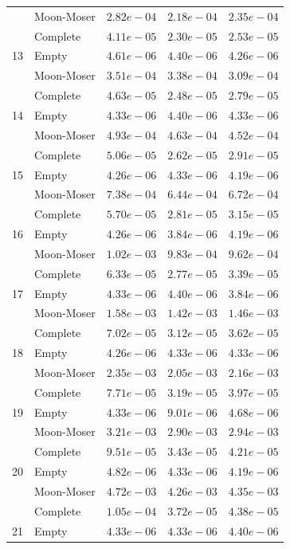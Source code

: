 \documentclass[12pt,a4paper]{article}
\begin{document}
\begin{longtable}{|l||l|l|l|l|}
  & Moon-Moser & $2.82e-04$ & $2.18e-04$ & $2.35e-04$ \\
  & Complete & $4.11e-05$ & $2.30e-05$ & $2.53e-05$ \\
  \hline
  13 & Empty & $4.61e-06$ & $4.40e-06$ & $4.26e-06$ \\
  & Moon-Moser & $3.51e-04$ & $3.38e-04$ & $3.09e-04$ \\
  & Complete & $4.63e-05$ & $2.48e-05$ & $2.79e-05$ \\
  \hline
  14 & Empty & $4.33e-06$ & $4.40e-06$ & $4.33e-06$ \\
  & Moon-Moser & $4.93e-04$ & $4.63e-04$ & $4.52e-04$ \\
  & Complete & $5.06e-05$ & $2.62e-05$ & $2.91e-05$ \\
  \hline
  15 & Empty & $4.26e-06$ & $4.33e-06$ & $4.19e-06$ \\
  & Moon-Moser & $7.38e-04$ & $6.44e-04$ & $6.72e-04$ \\
  & Complete & $5.70e-05$ & $2.81e-05$ & $3.15e-05$ \\
  \hline
  16 & Empty & $4.26e-06$ & $3.84e-06$ & $4.19e-06$ \\
  & Moon-Moser & $1.02e-03$ & $9.83e-04$ & $9.62e-04$ \\
  & Complete & $6.33e-05$ & $2.77e-05$ & $3.39e-05$ \\
  \hline
  17 & Empty & $4.33e-06$ & $4.40e-06$ & $3.84e-06$ \\
  & Moon-Moser & $1.58e-03$ & $1.42e-03$ & $1.46e-03$ \\
  & Complete & $7.02e-05$ & $3.12e-05$ & $3.62e-05$ \\
  \hline
  18 & Empty & $4.26e-06$ & $4.33e-06$ & $4.33e-06$ \\
  & Moon-Moser & $2.35e-03$ & $2.05e-03$ & $2.16e-03$ \\
  & Complete & $7.71e-05$ & $3.19e-05$ & $3.97e-05$ \\
  \hline
  19 & Empty & $4.33e-06$ & $9.01e-06$ & $4.68e-06$ \\
  & Moon-Moser & $3.21e-03$ & $2.90e-03$ & $2.94e-03$ \\
  & Complete & $9.51e-05$ & $3.43e-05$ & $4.21e-05$ \\
  \hline
  20 & Empty & $4.82e-06$ & $4.33e-06$ & $4.19e-06$ \\
  & Moon-Moser & $4.72e-03$ & $4.26e-03$ & $4.35e-03$ \\
  & Complete & $1.05e-04$ & $3.72e-05$ & $4.38e-05$ \\
  \hline
  21 & Empty & $4.33e-06$ & $4.33e-06$ & $4.40e-06$ \\

\end{longtable}
\end{document}
